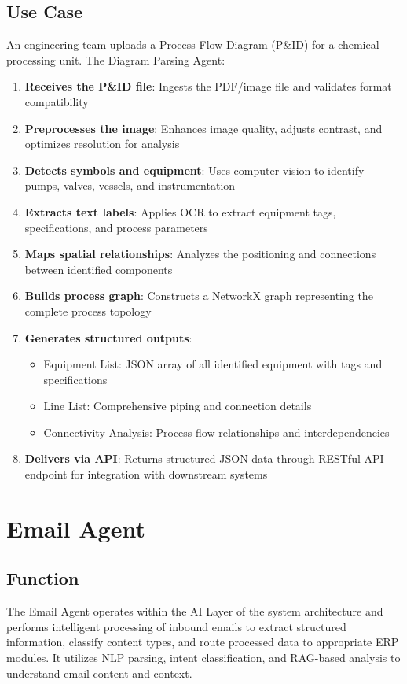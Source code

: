 \documentclass[12pt]{report}
\begin{document}
\section{Use Case}
An engineering team uploads a Process Flow Diagram (P\&ID) for a chemical processing unit. The Diagram Parsing Agent:
\begin{enumerate}
  \item \textbf{Receives the P\&ID file}: Ingests the PDF/image file and validates format compatibility
  \item \textbf{Preprocesses the image}: Enhances image quality, adjusts contrast, and optimizes resolution for analysis
  \item \textbf{Detects symbols and equipment}: Uses computer vision to identify pumps, valves, vessels, and instrumentation
  \item \textbf{Extracts text labels}: Applies OCR to extract equipment tags, specifications, and process parameters
  \item \textbf{Maps spatial relationships}: Analyzes the positioning and connections between identified components
  \item \textbf{Builds process graph}: Constructs a NetworkX graph representing the complete process topology
  \item \textbf{Generates structured outputs}:
    \begin{itemize}
      \item Equipment List: JSON array of all identified equipment with tags and specifications
      \item Line List: Comprehensive piping and connection details
      \item Connectivity Analysis: Process flow relationships and interdependencies
    \end{itemize}
  \item \textbf{Delivers via API}: Returns structured JSON data through RESTful API endpoint for integration with downstream systems
\end{enumerate}

\chapter{Email Agent}
\section{Function}
The Email Agent operates within the AI Layer of the system architecture and performs intelligent processing of inbound emails to extract structured information, classify content types, and route processed data to appropriate ERP modules. It utilizes NLP parsing, intent classification, and RAG-based analysis to understand email content and context.
\end{document}
